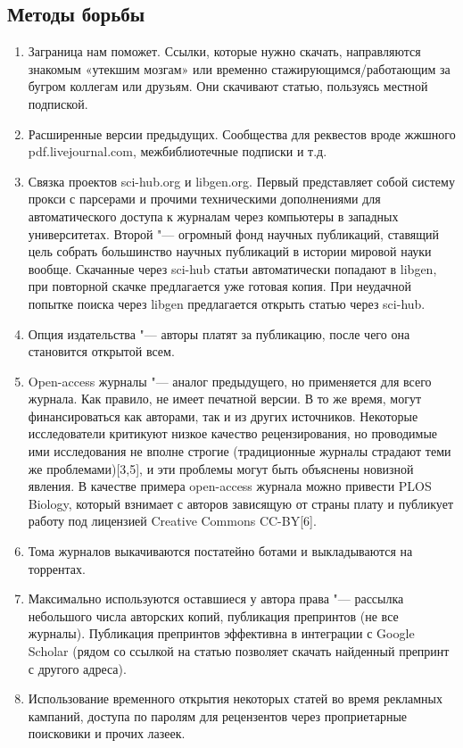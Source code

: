 \documentclass[10pt, a5paper]{article}
\begin{document}
\subsection*{Методы борьбы}

\begin{enumerate}
  \item Заграница нам поможет. Ссылки, которые нужно скачать, направляются знакомым «утекшим мозгам» или временно стажирующимся/работающим за бугром коллегам или друзьям. Они скачивают статью, пользуясь местной подпиской.
  \item Расширенные версии предыдущих. Сообщества для реквестов вроде жжшного pdf.livejournal.com, межбиблиотечные подписки и т.д.
  \item Связка проектов sci-hub.org и libgen.org. Первый представляет собой систему прокси с парсерами и прочими техническими дополнениями для автоматического доступа к журналам через компьютеры в западных университетах. Второй "--- огромный фонд научных публикаций, ставящий цель собрать большинство научных публикаций в истории мировой науки вообще. Скачанные через sci-hub статьи автоматически попадают в libgen, при повторной скачке предлагается уже готовая копия. При неудачной попытке поиска через libgen предлагается открыть статью через sci-hub.
  \item Опция издательства "--- авторы платят за публикацию, после чего она становится открытой всем.
  \item Open-access журналы "--- аналог предыдущего, но применяется для всего журнала. Как правило, не имеет печатной версии. В то же время, могут финансироваться как авторами, так и из других источников. Некоторые исследователи критикуют низкое качество рецензирования, но проводимые ими исследования не вполне строгие (традиционные журналы страдают теми же проблемами)[3,5], и эти проблемы могут быть объяснены новизной явления. В качестве примера open-access журнала можно привести PLOS Biology, который взнимает с авторов зависящую от страны плату и публикует работу под лицензией Creative Commons CC-BY[6].
  \item Тома журналов выкачиваются постатейно ботами и выкладываются на торрентах.
  \item Максимально используются оставшиеся у автора права "--- рассылка небольшого числа авторских копий, публикация препринтов (не все журналы). Публикация препринтов эффективна в интеграции с Google Scholar (рядом со ссылкой на статью позволяет скачать найденный препринт с другого адреса).
  \item Использование временного открытия некоторых статей во время рекламных кампаний, доступа по паролям для рецензентов через проприетарные поисковики и прочих лазеек.
\end{enumerate}
\end{document}
